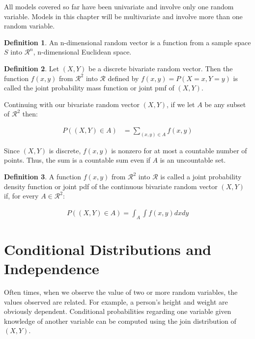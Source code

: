 \documentclass[11pt,a4paper]{report}
\theoremstyle{definition}
\newtheorem{defn}{Definition}[section]
\theoremstyle{theorem}
\theoremstyle{example}
\begin{document}
All models covered so far have been univariate and involve only one random variable.  Models in this chapter will be multivariate and involve more than one random variable.

\begin{defn}
An n-dimensional random vector is a function from a sample space $S$ into $\mathcal{R}^n$, n-dimensional Euclidean space.  
\end{defn}

\begin{defn}
Let $(X,Y)$ be a discrete bivariate random vector.  Then the function $f(x,y)$ from $\mathcal{R}^2$ into $\mathcal{R}$ defined by $f(x,y) = P(X = x, Y = y)$ is called the joint probability mass function or joint pmf of $(X,Y)$.
\end{defn}

Continuing with our bivariate random vector $(X,Y)$, if we let $A$ be any subset of $\mathcal{R}^2$ then:

\begin{align*}
  P((X,Y) \in A) &= \sum_{(x,y) \in A} f(x,y)
\end{align*}

Since $(X,Y)$ is discrete, $f(x,y)$ is nonzero for at most a countable  number of points.  Thus, the sum is a countable sum even if $A$ is an uncountable set.

\begin{defn}
  A function $f(x,y)$ from $\mathcal{R}^2$ into $\mathcal{R}$ is called a joint probability density function or joint pdf of the continuous bivariate random vector $(X,Y)$ if, for every $A \in \mathcal{R}^2$:

  \begin{align*}
    P((X,Y) \in A) = \int_A \int f(x,y) dx dy
  \end{align*}
\end{defn}

\section{Conditional Distributions and Independence}

Often times, when we observe the value of two or more random variables, the values observed are related.  For example, a person's height and weight are obviously dependent.  Conditional probabilities regarding one variable given knowledge of another variable can be computed using the join distribution of $(X,Y)$.
\end{document}
